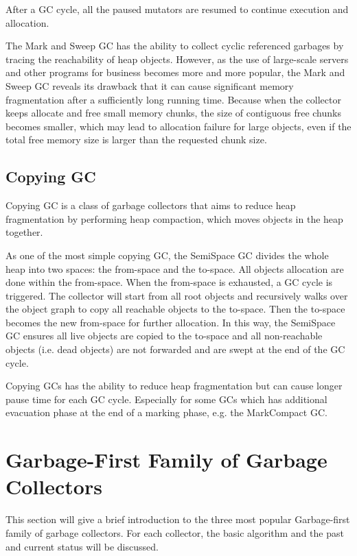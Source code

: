After a GC cycle, all the paused mutators are resumed to continue execution and allocation.

The Mark and Sweep GC has the ability to collect cyclic referenced garbages by tracing
the reachability of heap objects. However, as the use of large-scale servers and
other programs for business becomes more and more popular, the Mark and Sweep GC 
reveals its drawback that it can cause significant memory fragmentation after a
sufficiently long running time. Because when the collector keeps allocate and free
small memory chunks, the size of contiguous free chunks becomes smaller, which may
lead to allocation failure for large objects, even if the total free memory size
is larger than the requested chunk size.

\subsection{Copying GC}

Copying GC is a class of garbage collectors that aims to reduce heap fragmentation
by performing heap compaction, which moves objects in the heap together.

As one of the most simple copying GC, the SemiSpace GC divides the whole heap
into two spaces: the from-space and the to-space. All objects allocation are done
within the from-space. When the from-space is exhausted, a GC cycle is triggered.
The collector will start from all root objects and recursively walks over the
object graph to copy all reachable objects to the to-space. Then the to-space becomes
the new from-space for further allocation. In this way, the SemiSpace GC ensures all
live objects are copied to the to-space and all non-reachable objects (i.e. dead objects)
are not forwarded and are swept at the end of the GC cycle.

Copying GCs has the ability to reduce heap fragmentation but can cause longer
pause time for each GC cycle. Especially for some GCs which has additional evacuation
phase at the end of a marking phase, e.g. the MarkCompact GC.

\section{Garbage-First Family of Garbage Collectors}
\label{sec:g1collectors}

This section will give a brief introduction to the three most popular Garbage-first
family of garbage collectors. For each collector, the basic algorithm
and the past and current status will be discussed.

